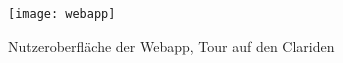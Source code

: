 
  \begin{figure}[H]
    \centering
    \texttt{[image: webapp]}
    \caption{Nutzeroberfläche der Webapp, Tour auf den Clariden}\label{fig:mainui}
  \end{figure}




